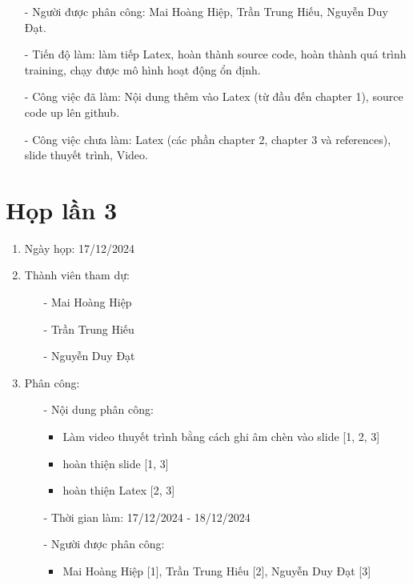 \begin{enumerate}
\begin{enumerate}
\begin{enumerate}
                    \item[-] Người được phân công: Mai Hoàng Hiệp, Trần Trung Hiếu, Nguyễn Duy Đạt. 
                    \item[-] Tiến độ làm: làm tiếp Latex, hoàn thành source code, hoàn thành quá trình training, chạy được mô hình hoạt động ổn định.
                    \item[-] Công việc đã làm: Nội dung thêm vào Latex (từ đầu đến chapter 1), source code up lên github. 
                    \item[-] Công việc chưa làm: Latex (các phần chapter 2, chapter 3 và references), slide thuyết trình, Video.
                \end{enumerate}
        \end{enumerate}
    \section{Họp lần 3}
        \begin{enumerate}
            \item Ngày họp: 17/12/2024
            \item Thành viên tham dự:
                \begin{enumerate}
                    \item[-] Mai Hoàng Hiệp
                    \item[-] Trần Trung Hiếu
                    \item[-] Nguyễn Duy Đạt
                \end{enumerate}
            \item Phân công:
                \begin{enumerate}
                    \item[-] Nội dung phân công:
                    \begin{itemize}
                        \item Làm video thuyết trình bằng cách ghi âm chèn vào slide [1, 2, 3]
                        \item hoàn thiện slide [1, 3]
                        \item hoàn thiện Latex [2, 3]
                    \end{itemize}
                    \item[-] Thời gian làm: 17/12/2024 - 18/12/2024
                    \item[-] Người được phân công:
                    \begin{itemize}
                        \item Mai Hoàng Hiệp [1], Trần Trung Hiếu [2], Nguyễn Duy Đạt [3]

\end{itemize}
\end{enumerate}
\end{enumerate}
\end{enumerate}
